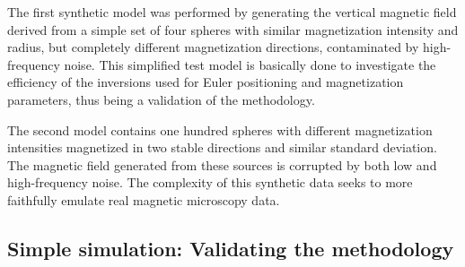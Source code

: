The first synthetic model was performed by generating the vertical magnetic field derived from a simple set of four spheres with similar magnetization intensity and radius, but completely different magnetization directions, contaminated by high-frequency noise. This simplified test model is basically done to investigate the efficiency of the inversions used for Euler positioning and magnetization parameters, thus being a validation of the methodology.

The second model contains one hundred spheres with different magnetization intensities magnetized in two stable directions and similar standard deviation. The magnetic field generated from these sources is corrupted by both low and high-frequency noise. The complexity of this synthetic data seeks to more faithfully emulate real magnetic microscopy data.


\subsection{Simple simulation: Validating the methodology}

